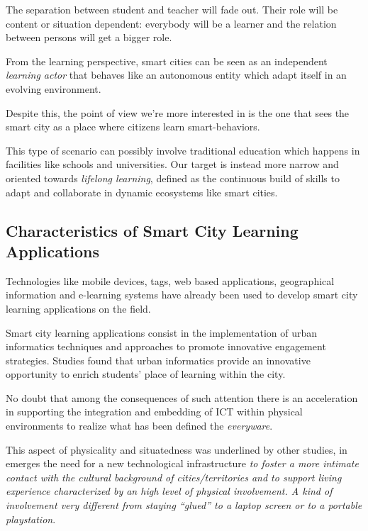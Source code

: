 The separation between student and teacher will fade out. Their role will be content or situation dependent: everybody will be a learner and the relation between persons will get a bigger role.

From the learning perspective, smart cities can be seen as an independent \textit{learning actor} that behaves like an autonomous entity which adapt itself in an evolving environment.

Despite this, the point of view we're more interested in is the one that sees the smart city as a place where citizens learn smart-behaviors.

This type of scenario can possibly involve traditional education which happens in facilities like schools and universities. Our target is instead more narrow and oriented towards \textit{lifelong learning}, defined as the continuous build of skills to adapt and collaborate in dynamic ecosystems like smart cities.


\subsection{Characteristics of Smart City Learning Applications}


Technologies like mobile devices, tags, web based applications, geographical information and e-learning systems have already been used to develop smart city learning applications on the field\cite{perez-sanagustin_multichannel_2013}\cite{delfatto_geographic_2013}.

Smart city learning applications consist in the implementation of urban informatics techniques and approaches to promote innovative engagement strategies\cite{amayocaldwell_urban_2013}.
Studies found that urban informatics provide an innovative opportunity to enrich students' place of learning within the city\cite{amayocaldwell_urban_2013}.

No doubt that among the consequences of such attention there is an acceleration in supporting the integration and embedding of ICT within physical environments to realize what has been defined the \textit{everyware}\cite{giffinger_smart_2007}.

This aspect of physicality and situatedness was underlined by other studies, in \cite{giovannella_scenarios_2013} emerges the need for a new technological infrastructure \textit{to foster a more intimate contact with the cultural background of cities/territories and to support living experience characterized by an high level of physical involvement. A kind of involvement very different from staying ``glued'' to a laptop screen or to a portable playstation}.


